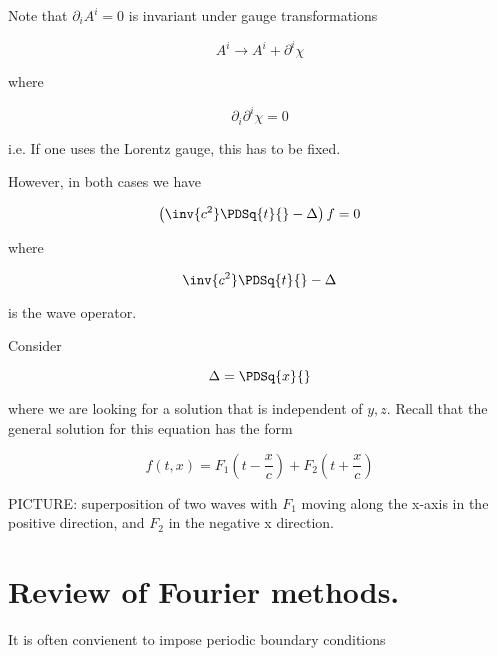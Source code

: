Note that $\partial_i A^i = 0$ is invariant under gauge transformations

\begin{equation}\label{eqn:relativisticElectrodynamicsL15:n}
A^i \rightarrow A^i + \partial^i \chi
\end{equation}

where 

\begin{equation}\label{eqn:relativisticElectrodynamicsL15:n}
\partial_i \partial^i \chi = 0
\end{equation}

i.e.  If one uses the Lorentz gauge, this has to be fixed.

However, in both cases we have 

\begin{equation}\label{eqn:relativisticElectrodynamicsL15:n}
\left( \inv{c^2} \PDSq{t}{} - \Delta \right) f = 0
\end{equation}

where 

\begin{equation}\label{eqn:relativisticElectrodynamicsL15:n}
\inv{c^2} \PDSq{t}{} - \Delta 
\end{equation}

is the wave operator.

Consider 

\begin{equation}\label{eqn:relativisticElectrodynamicsL15:n}
\Delta = \PDSq{x}{}
\end{equation}

where we are looking for a solution that is independent of $y, z$.  Recall that the general solution for this equation has the form

\begin{equation}\label{eqn:relativisticElectrodynamicsL15:n}
f(t, x) = 
F_1 \left(t - \frac{x}{c}\right)
+F_2 \left(t + \frac{x}{c}\right)
\end{equation}

PICTURE: superposition of two waves with $F_1$ moving along the x-axis in the positive direction, and $F_2$ in the negative x direction.

\section{Review of Fourier methods.}

It is often convienent to impose periodic boundary conditions

